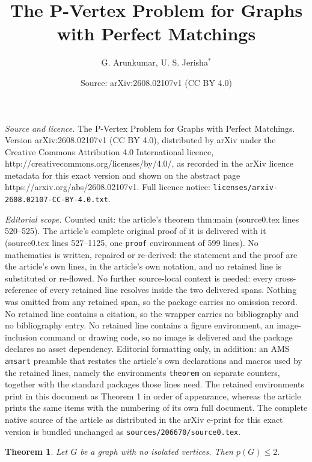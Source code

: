 \documentclass[10pt,a4paper]{amsart}
\title{The P-Vertex Problem for Graphs with Perfect Matchings}
\author{G. Arunkumar, U. S. Jerisha$^{\ast}$}
\date{Source: arXiv:2608.02107v1 (CC BY 4.0)}
\newtheorem{theorem}{Theorem}
\begin{document}
\maketitle

\noindent\emph{Source and licence.} The P-Vertex Problem for Graphs with Perfect Matchings. Version arXiv:2608.02107v1 (CC BY 4.0), distributed by arXiv under the Creative Commons Attribution 4.0 International licence, http://creativecommons.org/licenses/by/4.0/, as recorded in the arXiv licence metadata for this exact version and shown on the abstract page https://arxiv.org/abs/2608.02107v1. Full licence notice: \texttt{licenses/arxiv-2608.02107-CC-BY-4.0.txt}.\par\smallskip

\noindent\textit{Editorial scope.} Counted unit: the article's theorem thm:main (source0.tex lines 520--525). The article's complete original proof of it is delivered with it (source0.tex lines 527--1125, one \texttt{proof} environment of 599 lines). No mathematics is written, repaired or re-derived: the statement and the proof are the article's own lines, in the article's own notation, and no retained line is substituted or re-flowed.  No further source-local context is needed: every cross-reference of every retained line resolves inside the two delivered spans.  Nothing was omitted from any retained span, so the package carries no omission record.  No retained line contains a citation, so the wrapper carries no bibliography and no bibliography entry.  No retained line contains a figure environment, an image-inclusion command or drawing code, so no image is delivered and the package declares no asset dependency.  Editorial formatting only, in addition: an AMS \texttt{amsart} preamble that restates the article's own declarations and macros used by the retained lines, namely the environments \texttt{theorem} on separate counters, together with the standard packages those lines need.  The retained environments print in this document as Theorem 1 in order of appearance, whereas the article prints the same items with the numbering of its own full document.  The complete native source of the article as distributed in the arXiv e-print for this exact version is bundled unchanged as \texttt{sources/206670/source0.tex}.
\begin{theorem}\label{thm:main}
Let \(G\) be a graph with no isolated vertices. Then
\(
p(G)\leq 2.
\)
\end{theorem}
\end{document}
